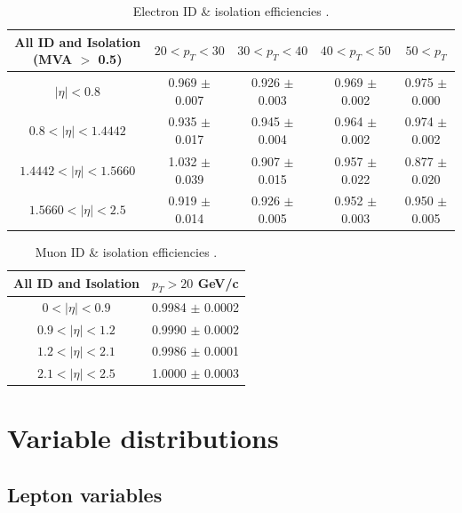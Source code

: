 \documentclass[oneside, a4paper, 11pt, ]{report}
\begin{document}
\begin{table} 
\begin{center}
\resizebox{\columnwidth}{!} {
\begin{tabular}{|c|c|c|c|c|}
\hline
	\textbf{All ID and Isolation (MVA $>$ 0.5)} & $20 < p_T < 30$ & $30 < p_T < 40$ & $40 < p_T < 50$ & $50 < p_T$ \\
\hline	
	$|\eta| < 0.8$ & 0.969 $\pm$ 0.007 & 0.926 $\pm$ 0.003 & 0.969 $\pm$ 0.002 & 0.975 $\pm$ 0.000 \\
	$0.8 < |\eta| < 1.4442$ & 0.935 $\pm$ 0.017 & 0.945 $\pm$ 0.004 & 0.964 $\pm$ 0.002 & 0.974 $\pm$ 0.002 \\
	$1.4442 < |\eta| < 1.5660$ & 1.032 $\pm$ 0.039 & 0.907 $\pm$ 0.015 & 0.957 $\pm$ 0.022 & 0.877 $\pm$ 0.020 \\
	$1.5660 < |\eta| < 2.5$ & 0.919 $\pm$ 0.014 & 0.926 $\pm$ 0.005 & 0.952 $\pm$ 0.003 & 0.950 $\pm$ 0.005 \\
\hline	
\end{tabular}
}
\end{center}
\caption{Electron ID \& isolation efficiencies \cite{ElectronEfficiencies}.}
\label{tab-ElectronEfficiencies}
\end{table}

\begin{table} 
\begin{center}
\begin{tabular}{|c|c|}
\hline
	\textbf{All ID and Isolation} & $p_T > 20$ GeV/c \\
\hline	
	$0 < |\eta| < 0.9$ & 0.9984 $\pm$ 0.0002 \\
	$0.9 < |\eta| < 1.2$ & 0.9990 $\pm$ 0.0002 \\
	$1.2 < |\eta| < 2.1$ & 0.9986 $\pm$ 0.0001 \\
	$2.1 < |\eta| < 2.5$ & 1.0000 $\pm$ 0.0003 \\
\hline	
\end{tabular}
\end{center}
\caption{Muon ID \& isolation efficiencies \cite{MuonEfficiencies}.}
\label{tab-MuonEfficiencies}
\end{table}

\section{Variable distributions}

\subsection{Lepton variables} \label{subsec-leptonPlots}
\end{document}

